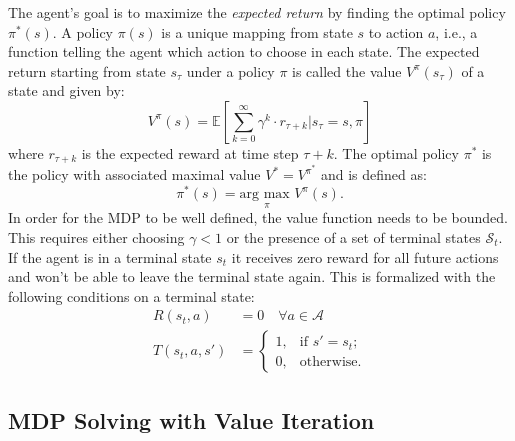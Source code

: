 The agent's goal is to maximize the \textit{expected return} by finding the optimal policy $\pi^*(s)$. A policy $\pi(s)$ is a unique mapping from state $s$ to action $a$, i.e., a function telling the agent which action to choose in each state. The expected return starting from state $s_\tau$ under a policy $\pi$ is called the value $V^\pi(s_\tau)$ of a state and given by:
%
\begin{equation}\label{eq:Vofpi}
    V^\pi(s) = \mathbb{E}\left[\sum_{k=0}^\infty \gamma^k\cdot r_{\tau+k}|s_\tau=s, \pi\right]
\end{equation}
%
where $r_{\tau+k}$ is the expected reward at time step $\tau+k$. 
The optimal policy $\pi^*$ is the policy with associated maximal value $V^*=V^{\pi^*}$ and is defined as:
%
\begin{equation}\label{eq:Vstar}
    \pi^*(s)=\underset{\pi}{\text{arg max }}V^\pi(s).
\end{equation}
%
In order for the MDP to be well defined, the value function needs to be bounded. This requires either choosing $\gamma<1$ or the presence of a set of terminal states $\mathcal{S}_t$. If the agent is in a terminal state $s_t$ it receives zero reward for all future actions and won't be able to leave the terminal state again. This is formalized with the following conditions on a terminal state:
%
\begin{align}
    R(s_t, a) &= 0 \quad \forall a\in\mathcal{A}\\
    T(s_t, a, s') &=  \begin{cases}1, & \text{if }s'=s_t;\\0, & \text{otherwise}.\end{cases}
\end{align}
%

    




\subsection{MDP Solving with Value Iteration}\label{subsec:VALUEIT}

